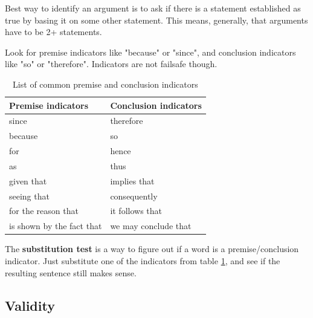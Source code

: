 \begin{readingnotes}
	Best way to identify an argument is to ask if there is a statement established
	as true by basing it on some other statement. This means, generally, that
	arguments have to be 2+ statements.

	Look for premise indicators like "because" or "since", and conclusion indicators
	like "so" or "therefore". Indicators are not failsafe though.
\end{readingnotes}

\begin{table}[htb]
	\centering
	\caption{List of common premise and conclusion indicators}
	\begin{tabular}{|l|l|}
		\hline
		\textbf{Premise indicators} & \textbf{Conclusion indicators} \\ \hline
		since                       & therefore                      \\ \hline
		because                     & so                             \\ \hline
		for                         & hence                          \\ \hline
		as                          & thus                           \\ \hline
		given that                  & implies that                   \\ \hline
		seeing that                 & consequently                   \\ \hline
		for the reason that         & it follows that                \\ \hline
		is shown by the fact that   & we may conclude that           \\ \hline
	\end{tabular}
	\label{tab:indicators}
\end{table}

\begin{readingnotes}
	The \textbf{substitution test} is a way to figure out if a word is a premise/conclusion
	indicator. Just substitute one of the indicators from table \ref{tab:indicators},
	and see if the resulting sentence still makes sense.
\end{readingnotes}

\subsection{Validity}

